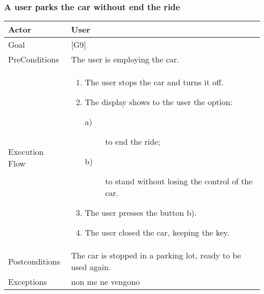 \documentclass{article}
\begin{document}
	\subsubsection{A user parks the car without end the ride}
	\begin{tabularx}{\textwidth}{  l  X  }
		\hline
		Actor & User\\
		\hline
		Goal & [G9]\\
		\hline
		PreConditions & The user is employing the car.\\
		\hline
		Execution Flow & \begin{enumerate}
			\item{The user stops the car and turns it off.}
										 \item{The display shows to the user the option:
										 \begin{description} 
										 					\item[a)]{ to end the ride;}
															\item[b)]{ to stand without losing the control of the car.}
										\end{description}}
										 \item{The user presses the button b).}
										 \item{The user closed the car, keeping the key.}
										\end{enumerate}\\
		\hline
		Postconditions & The car is stopped in a parking lot, ready to be used again.\\
		\hline
		Exceptions & non me ne vengono\\
		\hline
	\end{tabularx}
\end{document}
